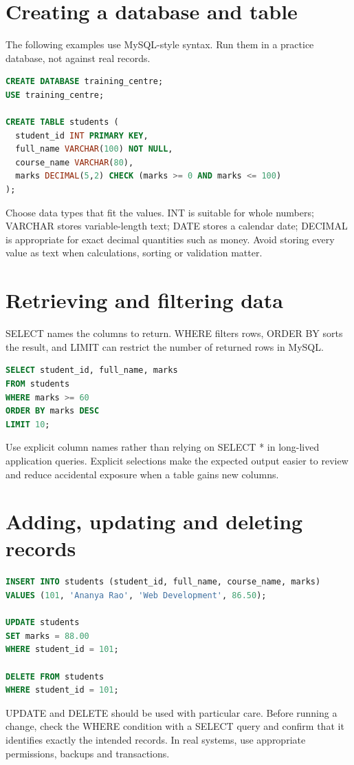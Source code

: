 \documentclass[11pt,openany,oneside]{book}
\begin{document}
\section{Creating a database and table}
The following examples use MySQL-style syntax. Run them in a practice database, not against real records.

\begin{lstlisting}[style=webcode,language=SQL]
CREATE DATABASE training_centre;
USE training_centre;

CREATE TABLE students (
  student_id INT PRIMARY KEY,
  full_name VARCHAR(100) NOT NULL,
  course_name VARCHAR(80),
  marks DECIMAL(5,2) CHECK (marks >= 0 AND marks <= 100)
);
\end{lstlisting}
Choose data types that fit the values. INT is suitable for whole numbers; VARCHAR stores variable-length text; DATE stores a calendar date; DECIMAL is appropriate for exact decimal quantities such as money. Avoid storing every value as text when calculations, sorting or validation matter.

\section{Retrieving and filtering data}
SELECT names the columns to return. WHERE filters rows, ORDER BY sorts the result, and LIMIT can restrict the number of returned rows in MySQL.

\begin{lstlisting}[style=webcode,language=SQL]
SELECT student_id, full_name, marks
FROM students
WHERE marks >= 60
ORDER BY marks DESC
LIMIT 10;
\end{lstlisting}
Use explicit column names rather than relying on SELECT * in long-lived application queries. Explicit selections make the expected output easier to review and reduce accidental exposure when a table gains new columns.

\section{Adding, updating and deleting records}
\begin{lstlisting}[style=webcode,language=SQL]
INSERT INTO students (student_id, full_name, course_name, marks)
VALUES (101, 'Ananya Rao', 'Web Development', 86.50);

UPDATE students
SET marks = 88.00
WHERE student_id = 101;

DELETE FROM students
WHERE student_id = 101;
\end{lstlisting}
UPDATE and DELETE should be used with particular care. Before running a change, check the WHERE condition with a SELECT query and confirm that it identifies exactly the intended records. In real systems, use appropriate permissions, backups and transactions.
\end{document}
